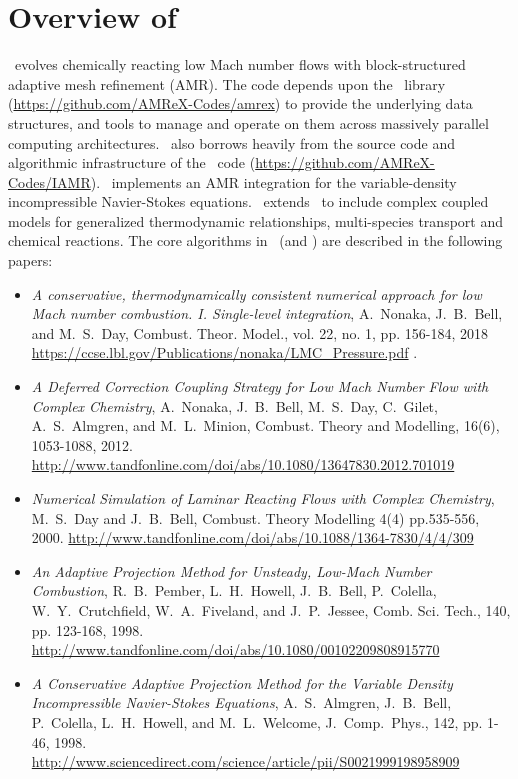 
\section{Overview of \pelelm}

\pelelm\ evolves chemically reacting low Mach number flows with block-structured adaptive mesh refinement (AMR).
The code depends upon the \amrex\ library (\url{https://github.com/AMReX-Codes/amrex}) to provide
the underlying data structures, and tools to manage and operate on them across
massively parallel computing architectures. \pelelm\ also borrows heavily
from the source code and algorithmic infrastructure of the \iamr\ code (\url{https://github.com/AMReX-Codes/IAMR}).
\iamr\ implements an AMR integration for the variable-density incompressible Navier-Stokes equations.
\pelelm\ extends \iamr\ to include complex coupled models for generalized thermodynamic relationships, 
multi-species transport and chemical reactions.  The core algorithms in \pelelm\ (and \iamr) are described
in the following papers:

\begin{itemize}

\item {\it A conservative, thermodynamically consistent numerical approach for low Mach number 
combustion. I. Single-level integration},
A.~Nonaka, J.~B.~Bell, and M.~S.~Day, Combust. Theor. Model., vol. 22, no. 1, pp. 156-184, 2018
\url{https://ccse.lbl.gov/Publications/nonaka/LMC_Pressure.pdf} \cite{LMC-P}.

\item {\it A Deferred Correction Coupling Strategy for Low Mach Number Flow with Complex Chemistry},
A.~Nonaka, J.~B.~Bell, M.~S.~Day, C.~Gilet, A.~S.~Almgren, and M.~L.~Minion,
Combust. Theory and Modelling, 16(6), 1053-1088, 2012. 
\url{http://www.tandfonline.com/doi/abs/10.1080/13647830.2012.701019} \cite{LMC_SDC}

\item {\it Numerical Simulation of Laminar Reacting Flows with Complex Chemistry},
M.~S.~Day and J.~B.~Bell,
Combust. Theory Modelling 4(4) pp.535-556, 2000.
\url{http://www.tandfonline.com/doi/abs/10.1088/1364-7830/4/4/309} \cite{DayBell:2000}

\item {\it An Adaptive Projection Method for Unsteady, Low-Mach Number Combustion}, 
R.~B.~Pember, L.~H.~Howell, J.~B.~Bell, P.~Colella, W.~Y.~Crutchfield, W.~A.~Fiveland, and J.~P.~Jessee,
Comb. Sci. Tech., 140, pp. 123-168, 1998.
\url{http://www.tandfonline.com/doi/abs/10.1080/00102209808915770} \cite{pember-flame}

\item {\it A Conservative Adaptive Projection Method for the Variable Density Incompressible Navier-Stokes Equations},
A.~S.~Almgren, J.~B.~Bell, P.~Colella, L.~H.~Howell, and M.~L.~Welcome,
J.~Comp.~Phys., 142, pp. 1-46, 1998.
\url{http://www.sciencedirect.com/science/article/pii/S0021999198958909} \cite{IAMR}

\end{itemize}         


